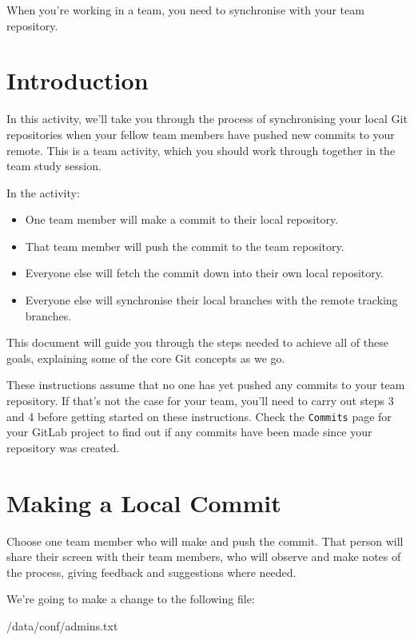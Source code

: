 \documentclass[
]{book}
\newenvironment{Shaded}{\begin{snugshade}}{\end{snugshade}}
\newcommand{\NormalTok}[1]{#1}
\providecommand{\tightlist}{%
  \setlength{\itemsep}{0pt}\setlength{\parskip}{0pt}}
\begin{document}
When you're working in a team, you need to synchronise with your team repository.

\hypertarget{syncintro}{%
\section{Introduction}\label{syncintro}}

In this activity, we'll take you through the process of synchronising your local Git repositories when your fellow team members have pushed new commits to your remote. This is a team activity, which you should work through together in the team study session.

In the activity:

\begin{itemize}
\tightlist
\item
  One team member will make a commit to their local repository.
\item
  That team member will push the commit to the team repository.
\item
  Everyone else will fetch the commit down into their own local repository.
\item
  Everyone else will synchronise their local branches with the remote tracking branches.
\end{itemize}

This document will guide you through the steps needed to achieve all of these goals, explaining some of the core Git concepts as we go.

These instructions assume that no one has yet pushed any commits to your team repository. If that's not the case for your team, you'll need to carry out steps 3 and 4 before getting started on these instructions. Check the \texttt{Commits} page for your GitLab project to find out if any commits have been made since your repository was created.

\hypertarget{locommit}{%
\section{Making a Local Commit}\label{locommit}}

Choose one team member who will make and push the commit. That person will share their screen with their team members, who will observe and make notes of the process, giving feedback and suggestions where needed.

We're going to make a change to the following file:

\begin{Shaded}
\begin{Highlighting}[]
\NormalTok{/data/conf/admins.txt}
\end{Highlighting}
\end{Shaded}
\end{document}
